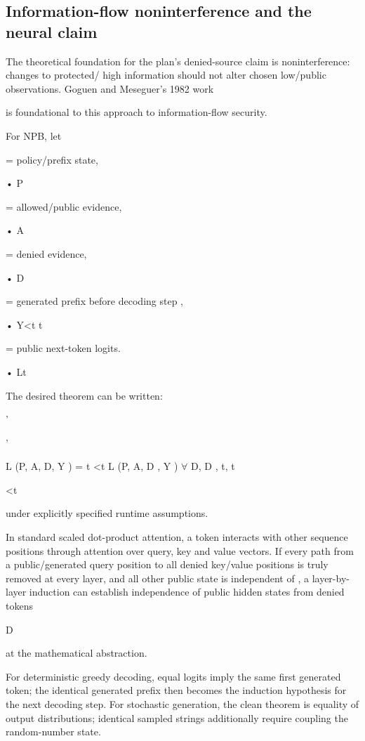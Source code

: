 \documentclass[11pt,a4paper]{article}
\begin{document}
\subsection*{Information-flow noninterference and the neural claim}
The theoretical foundation for the plan's denied-source claim is noninterference: changes to protected/ high information should not alter chosen low/public observations. Goguen and Meseguer's 1982 work\par
is foundational to this approach to information-flow security.\par
For NPB, let\par
= policy/prefix state,\par
• P\par
= allowed/public evidence,\par
• A\par
= denied evidence,\par
• D\par
= generated prefix before decoding step ,\par
• Y<t t\par
= public next-token logits.\par
• Lt\par
The desired theorem can be written:\par
'\par
'\par
L (P, A, D, Y ) = t <t L (P, A, D , Y )  $\forall$ D, D , t, t\par
<t\par
under explicitly specified runtime assumptions.\par
In standard scaled dot-product attention, a token interacts with other sequence positions through attention over query, key and value vectors. If every path from a public/generated query position to all denied key/value positions is truly removed at every layer, and all other public state is independent of , a layer-by-layer induction can establish independence of public hidden states from denied tokens\par
D\par
at the mathematical abstraction.\par
For deterministic greedy decoding, equal logits imply the same first generated token; the identical generated prefix then becomes the induction hypothesis for the next decoding step. For stochastic generation, the clean theorem is equality of output distributions; identical sampled strings additionally require coupling the random-number state.\par
\end{document}
